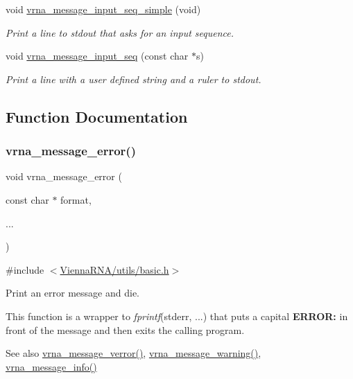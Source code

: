 \begin{DoxyCompactItemize}
void \hyperlink{group__message__utils_gaee1dd652ca5b9e56b096963a1576f73b}{vrna\+\_\+message\+\_\+input\+\_\+seq\+\_\+simple} (void)
\begin{DoxyCompactList}\small\item\em Print a line to {\itshape stdout} that asks for an input sequence. \end{DoxyCompactList}\item 
void \hyperlink{group__message__utils_gaf4d194d558b0c975f269de01dea52460}{vrna\+\_\+message\+\_\+input\+\_\+seq} (const char $\ast$s)
\begin{DoxyCompactList}\small\item\em Print a line with a user defined string and a ruler to stdout. \end{DoxyCompactList}\end{DoxyCompactItemize}


\subsection{Function Documentation}
\mbox{\label{group__message__utils_ga36b35be01d7f36cf7f59c245eee628d1}} 
\subsubsection{\texorpdfstring{vrna\+\_\+message\+\_\+error()}{vrna\_message\_error()}}
{\footnotesize\ttfamily void vrna\+\_\+message\+\_\+error (\begin{DoxyParamCaption}\item[{const char $\ast$}]{format,  }\item[{}]{... }\end{DoxyParamCaption})}



{\ttfamily \#include $<$\hyperlink{utils_2basic_8h}{Vienna\+R\+N\+A/utils/basic.\+h}$>$}



Print an error message and die. 

This function is a wrapper to {\itshape fprintf}(stderr, ...) that puts a capital {\bfseries E\+R\+R\+OR\+:} in front of the message and then exits the calling program.

\begin{DoxySeeAlso}{See also}
\hyperlink{group__message__utils_gabc1a08dea0d84b5c33701732172a8b18}{vrna\+\_\+message\+\_\+verror()}, \hyperlink{group__message__utils_ga6e07ed24add60693ba886d54d0a46635}{vrna\+\_\+message\+\_\+warning()}, \hyperlink{group__message__utils_ga039bae6153a6415b054dbe6045f83d03}{vrna\+\_\+message\+\_\+info()}
\end{DoxySeeAlso}

